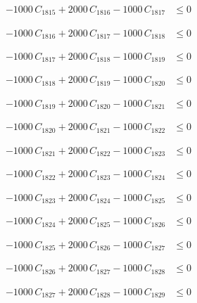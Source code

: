 \documentclass[a4paper,11pt]{article}
\begin{document}
\begin{align}
-1000\,C_{1815} + 2000\,C_{1816} - 1000\,C_{1817} &\leq 0 \nonumber
\end{align}

\begin{align}
-1000\,C_{1816} + 2000\,C_{1817} - 1000\,C_{1818} &\leq 0 \nonumber
\end{align}

\begin{align}
-1000\,C_{1817} + 2000\,C_{1818} - 1000\,C_{1819} &\leq 0 \nonumber
\end{align}

\begin{align}
-1000\,C_{1818} + 2000\,C_{1819} - 1000\,C_{1820} &\leq 0 \nonumber
\end{align}

\begin{align}
-1000\,C_{1819} + 2000\,C_{1820} - 1000\,C_{1821} &\leq 0 \nonumber
\end{align}

\begin{align}
-1000\,C_{1820} + 2000\,C_{1821} - 1000\,C_{1822} &\leq 0 \nonumber
\end{align}

\begin{align}
-1000\,C_{1821} + 2000\,C_{1822} - 1000\,C_{1823} &\leq 0 \nonumber
\end{align}

\begin{align}
-1000\,C_{1822} + 2000\,C_{1823} - 1000\,C_{1824} &\leq 0 \nonumber
\end{align}

\begin{align}
-1000\,C_{1823} + 2000\,C_{1824} - 1000\,C_{1825} &\leq 0 \nonumber
\end{align}

\begin{align}
-1000\,C_{1824} + 2000\,C_{1825} - 1000\,C_{1826} &\leq 0 \nonumber
\end{align}

\begin{align}
-1000\,C_{1825} + 2000\,C_{1826} - 1000\,C_{1827} &\leq 0 \nonumber
\end{align}

\begin{align}
-1000\,C_{1826} + 2000\,C_{1827} - 1000\,C_{1828} &\leq 0 \nonumber
\end{align}

\begin{align}
-1000\,C_{1827} + 2000\,C_{1828} - 1000\,C_{1829} &\leq 0 \nonumber
\end{align}
\end{document}
